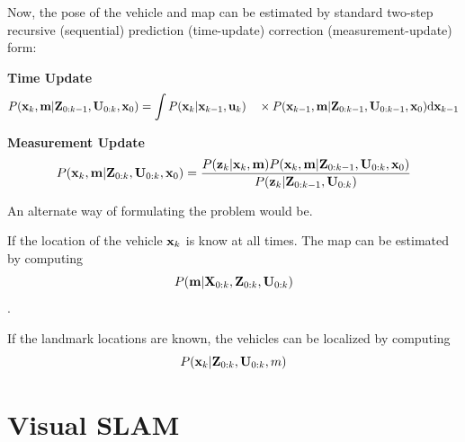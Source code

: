 Now, the pose of the vehicle and map can be estimated by standard two-step recursive (sequential) prediction (time-update) correction (measurement-update) form:

\textbf{Time Update}
\begin{equation}
P({\bf x}_{k},{\bf m}\vert {\bf Z}_{0:k-1},{\bf U}_{0:k},{\bf x}_{0})= \int P({\bf x}_{k}\vert {\bf x}_{k-1},{\bf u}_{k}) \quad\times P({\bf x}_{k-1},{\bf m}\vert {\bf Z}_{0:k-1}, {\bf U}_{0:k-1},{\bf x}_{0}){\rm d}{\bf x}_{k-1}
\end{equation}

\textbf{Measurement Update}
\begin{equation}
P({\bf x}_{k},{\bf m}\vert {\bf Z}_{0:k},{\bf U}_{0:k},{\bf x}_{0}) = {P({\bf z}_{k}\vert {\bf x}_{k},{\bf m})P({\bf x}_{k}, {\bf m}\vert {\bf Z}_{0:k-1},{\bf U}_{0:k},{\bf x}_{0})\over P({\bf z}_{k}\vert {\bf Z}_{0:k-1},{\bf U}_{0:k})}
\end{equation}

An alternate way of formulating the problem would be.

If the location of the vehicle ${\bf x}_k$ is know at all times. The map can be estimated by computing
\begin{equation}
P({\bf m}\vert {\bf X}_{0:k},{\bf Z}_{0:k}, {\bf U}_{0:k})
\end{equation}
. 

If the landmark locations are known, the vehicles can be localized by computing
\begin{equation}
P({\bf x}_k\vert {\bf Z}_{0:k},{\bf U}_{0:k}, m)
\end{equation}

\section{Visual SLAM}


\FloatBarrier

